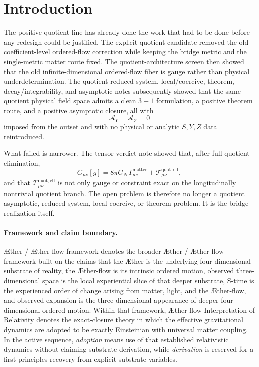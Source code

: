 \documentclass[11pt]{article}
\newcommand{\Aether}{\AE{}ther}
\newcommand{\Aflow}{\AE{}ther-flow}
\newcommand{\TheoryName}{\Aflow{} Interpretation of Relativity}
\newcommand{\TheoryProgram}{\Aether{} / \Aflow{} framework}
\newcommand{\EffAux}{\mathcal T_{\mu\nu}^{\mathrm{quot,eff}}}
\begin{document}
\section{Introduction}

The positive quotient line has already done the work that had to be done before any redesign could be justified. The explicit quotient candidate removed the old coefficient-level ordered-flow correction while keeping the bridge metric and the single-metric matter route fixed. The quotient-architecture screen then showed that the old infinite-dimensional ordered-flow fiber is gauge rather than physical underdetermination. The quotient reduced-system, local/coercive, theorem, decay/integrability, and asymptotic notes subsequently showed that the same quotient physical field space admits a clean \(3+1\) formulation, a positive theorem route, and a positive asymptotic closure, all with
\[
\mathcal A_Y=\mathcal A_Z=0
\]
imposed from the outset and with no physical or analytic \(S,Y,Z\) data reintroduced.

What failed is narrower. The tensor-verdict note showed that, after full quotient elimination,
\begin{equation}
G_{\mu\nu}[g]
=
8\pi G_N\,T_{\mu\nu}^{\mathrm{matter}}
+ \EffAux,
\label{eq:oldverdict}
\end{equation}
and that \(\EffAux\) is not only gauge or constraint exact on the longitudinally nontrivial quotient branch. The open problem is therefore no longer a quotient asymptotic, reduced-system, local-coercive, or theorem problem. It is the bridge realization itself.

\paragraph{Framework and claim boundary.}
\TheoryProgram{} denotes the broader \Aether{} / \Aflow{} framework built on the claims that the \Aether{} is the underlying four-dimensional substrate of reality, the \Aflow{} is its intrinsic ordered motion, observed three-dimensional space is the local experiential slice of that deeper substrate, S-time is the experienced order of change arising from matter, light, and the \Aflow{}, and observed expansion is the three-dimensional appearance of deeper four-dimensional ordered motion. Within that framework, \TheoryName{} denotes the exact-closure theory in which the effective gravitational dynamics are adopted to be exactly Einsteinian with universal matter coupling. In the active sequence, \emph{adoption} means use of that established relativistic dynamics without claiming substrate derivation, while \emph{derivation} is reserved for a first-principles recovery from explicit substrate variables.
\end{document}
